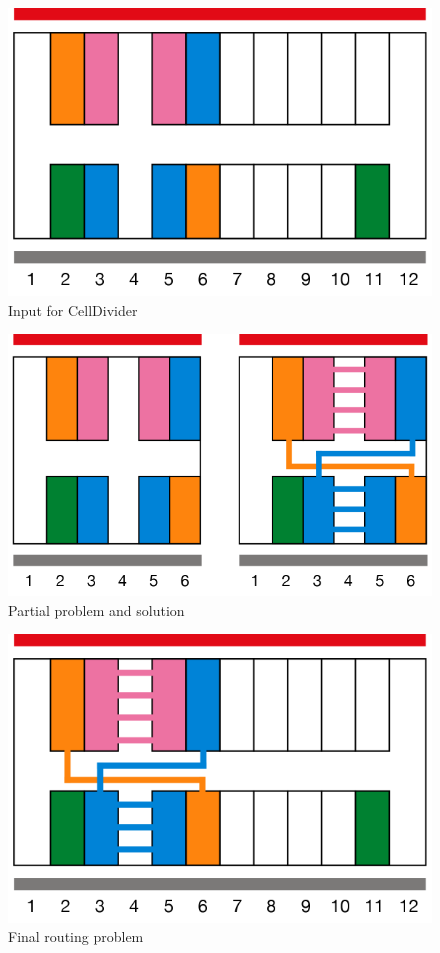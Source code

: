 \begin{figure}[h!]
  \centering
  \includegraphics[scale=0.5]{img/design/2bandesbuida.png}
  \caption{Input for CellDivider}
  \label{fig:2bandesbuida}
\end{figure} 

\begin{figure}[h!]
  \centering
  \includegraphics[scale=0.5]{img/design/2bandesmitja.png}
  \caption{Partial problem and solution}
  \label{fig:2bandesmitja}
\end{figure} 

\begin{figure}[h!]
  \centering
  \includegraphics[scale=0.5]{img/design/2bandesplena.png}
  \caption{Final routing problem}
  \label{fig:2bandesplena}
\end{figure} 

